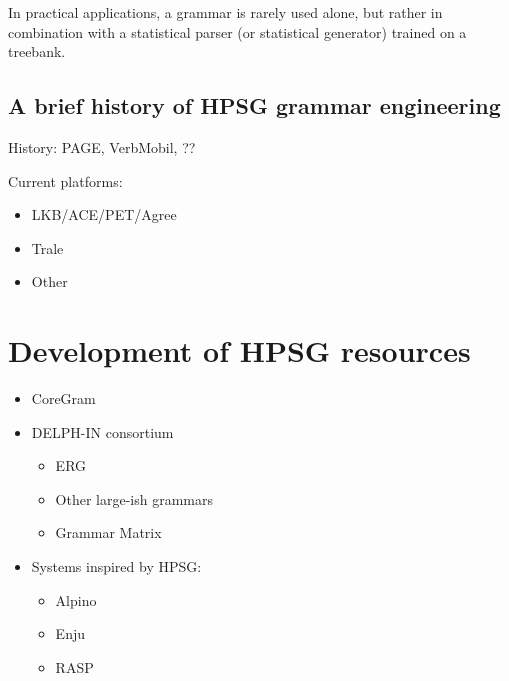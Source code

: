 \documentclass[output=paper]{langsci/langscibook}
\begin{document}
In practical applications, a grammar is rarely used alone,
but rather in combination with a statistical parser (or statistical generator) trained on a treebank.



\subsection{A brief history of HPSG grammar engineering}
\label{sec:history}

History: PAGE, VerbMobil, ?? %

Current platforms:
    \begin{itemize}
    \item LKB/ACE/PET/Agree
    \item Trale
    \item Other
    \end{itemize}


\section{Development of HPSG resources}
\label{sec:resources}


\begin{itemize}
 \item  CoreGram
 \item  DELPH-IN consortium
    \begin{itemize}
    \item ERG
    \item Other large-ish grammars
    \item Grammar Matrix
    \end{itemize}
 \item Systems inspired by HPSG:
   \begin{itemize}
     \item Alpino
     \item Enju
     \item RASP
   \end{itemize}
\end{itemize}



\end{document}
